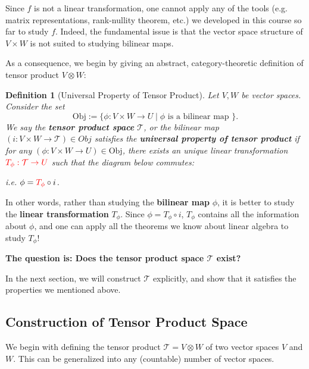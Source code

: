 \documentclass[11pt]{article}
\newtheorem{definition}[theorem]{Definition}
\begin{document}
Since $f$ is not a linear transformation, one cannot apply any of the tools (e.g. matrix representations, rank-nullity theorem, etc.) we developed in this course so far to study $f$. Indeed, the fundamental issue is that the vector space structure of \(V \times  W\) is not suited to studying bilinear maps. 

As a consequence, we begin by giving an abstract, category-theoretic definition of tensor product $V \otimes W$:

\begin{definition}[Universal Property of Tensor Product]  \label{def:univtensor} Let \(V,W\) be vector spaces. Consider the set
\[
\text{Obj} :=  \{ \phi  : V \times  W \rightarrow  U \mid  \phi \text{ is a bilinear map }\}.
\]
We say the {\bf tensor product space} \(\mathcal{T}\), or the bilinear map \(\left( {i : V \times  W \rightarrow  \mathcal{T}}\right)  \in Obj\) satisfies the {\bf universal property of tensor product} if for any \((\phi  : V \times  W \rightarrow U) \in  \mathrm{{Obj}}\), there exists an unique linear transformation \(\color{red} T_{\phi } : \mathcal{T} \rightarrow  U\) such that the diagram below commutes:


\begin{center}
 \quad \quad \quad i.e. \(\phi  = {\color{red} T_{\phi}} \circ  i\).
\end{center} 

\end{definition}


In other words, rather than studying the {\bf bilinear map} \(\phi\), it is better to study the {\bf linear transformation} \(T_{\phi }\). Since $\phi = T_{\phi} \circ i$, $T_{\phi}$ contains all the information about $\phi$, and one can apply all the theorems we know about linear algebra to study $T_{\phi}$!

\medskip
{\bf The question is: Does the tensor product space \(\mathcal{T}\) exist? }

\medskip
In the next section, we will construct $\mathcal{T}$ explicitly, and show that it satisfies the properties we mentioned above.

\subsection{Construction of Tensor Product Space}
We begin with defining the tensor product $\mathcal{T} = V \otimes W$ of two vector spaces $V$ and $W$. This can be generalized into any (countable) number of vector spaces.
\end{document}
